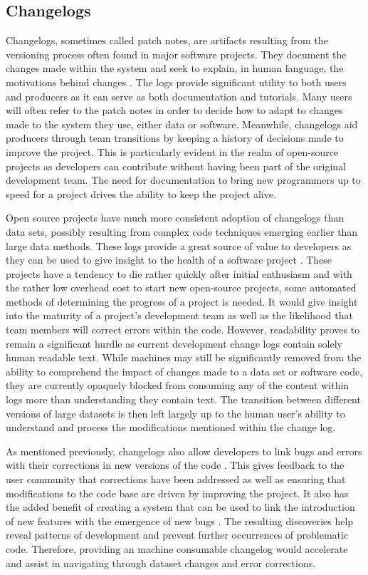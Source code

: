 \subsection{Changelogs}

Changelogs, sometimes called patch notes, are artifacts resulting from the versioning process often found in major software projects.
They document the changes made within the system and seek to explain, in human language, the motivations behind changes \cite{uel1037}.
The logs provide significant utility to both users and producers as it can serve as both documentation and tutorials.
Many users will often refer to the patch notes in order to decide how to adapt to changes made to the system they use, either data or software.
Meanwhile, changelogs aid producers through team transitions by keeping a history of decisions made to improve the project.
This is particularly evident in the realm of open-source projects as developers can contribute without having been part of the original development team.
The need for documentation to bring new programmers up to speed for a project drives the ability to keep the project alive.

Open source projects have much more consistent adoption of changelogs than data sets, possibly resulting from complex code techniques emerging earlier than large data methods.
These logs provide a great source of value to developers as they can be used to give insight to the health of a software project \cite{German03automatingthe}.
These projects have a tendency to die rather quickly after initial enthusiasm and with the rather low overhead cost to start new open-source projects, some automated methods of determining the progress of a project is needed.
It would give insight into the maturity of a project's development team as well as the likelihood that team members will correct errors within the code.
However, readability proves to remain a significant hurdle as current development change logs contain solely human readable text.
While machines may still be significantly removed from the ability to comprehend the impact of changes made to a data set or software code, they are currently opaquely blocked from consuming any of the content within logs more than understanding they contain text.
The transition between different versions of large datasets is then left largely up to the human user's ability to understand and process the modifications mentioned within the change log.

As mentioned previously, changelogs also allow developers to link bugs and errors with their corrections in new versions of the code \cite{Chen:2004:OCL:990374.990391}.
This gives feedback to the user community that corrections have been addressed as well as ensuring that modifications to the code base are driven by improving the project.
It also has the added benefit of creating a system that can be used to link the introduction of new features with the emergence of new bugs \cite{6132954}.
The resulting discoveries help reveal patterns of development and prevent further occurrences of problematic code.
Therefore, providing an machine consumable changelog would accelerate and assist in navigating through dataset changes and error corrections.

